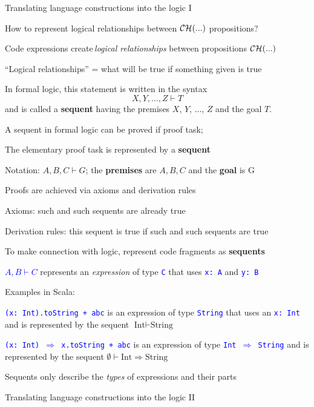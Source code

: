 Translating language constructions into the logic I

How to represent logical relationships between ${\cal CH}(...)$ propositions?

Code expressions create\,\emph{logical relationships} between propositions
${\cal CH}(...)$

``Logical relationships'' = what will be true if something given
is true

In formal logic, this statement is written in the syntax
\[
X,Y,...,Z\vdash T
\]
and is called a \textbf{sequent} having the premises
$X$, $Y$, ..., $Z$ and the goal $T$.

A sequent in formal logic can be proved if proof task;

The elementary proof task is represented by a \textbf{sequent}

Notation: $A,B,C\vdash G$; the \textbf{premises} are $A,B,C$ and
the \textbf{goal} is G

Proofs are achieved via axioms and derivation rules

Axioms: such and such sequents are already true

Derivation rules: this sequent is true if such and such sequents are
true

To make connection with logic, represent code fragments as \textbf{sequents}

\textcolor{blue}{$A,B\vdash C$} represents an \emph{expression} of
type \texttt{\textcolor{blue}{\footnotesize{}C}} that uses \texttt{\textcolor{blue}{\footnotesize{}x:\ A}}
and \texttt{\textcolor{blue}{\footnotesize{}y:\ B}}{\footnotesize\par}

Examples in Scala:

\texttt{\textcolor{blue}{\footnotesize{}(x:\ Int).toString + \textquotedbl abc\textquotedbl}}
is an expression of type \texttt{\textcolor{blue}{\footnotesize{}String}}
that uses an \texttt{\textcolor{blue}{\footnotesize{}x:\ Int}} and
is represented by the sequent $\text{Int}\vdash\text{String}$

\texttt{\textcolor{blue}{\footnotesize{}(x:\ Int) $\Rightarrow$
x.toString + \textquotedbl abc\textquotedbl}} is an expression
of type \texttt{\textcolor{blue}{\footnotesize{}Int $\Rightarrow$
String}} and is represented by the sequent $\emptyset\vdash\text{Int}\Rightarrow\text{String}$

Sequents only describe the \emph{types} of expressions and their parts

Translating language constructions into the logic II

